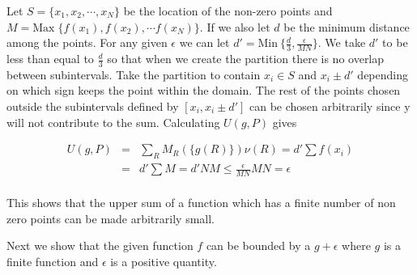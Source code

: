 \documentclass[11pt,reqno]{article}
\begin{document}
Let $S = \{ x_1, x_2,\cdots,x_N \}$ be the location of the non-zero points and $M = \text{Max} \;\{ f(x_1),f(x_2), \cdots f(x_N) \}$. If we also let $d$ be the minimum distance among the points. For any given $\epsilon$ we can let $d' = \text{Min} \: \{ \frac{d}{3}, \frac{\epsilon}{M N} \} $. We take $d'$ to be less than equal to $\frac{d}{3}$ so that when we create the partition there is no overlap between subintervals. Take the partition to contain $x_i \in S$ and $x_i \pm d'$ depending on which sign keeps the point within the domain. The rest of the points chosen outside the subintervals defined by $[x_i,x_i \pm d']$ can be chosen arbitrarily since y will not contribute to the sum. Calculating $U(g,P)$ gives

\begin{eqnarray*}
U(g,P) &=& \sum_R M_R( \{ g(R) \}) \nu(R) = d' \sum f(x_i) \\
&=& d' \sum M = d' N M \le \frac{\epsilon}{MN} MN = \epsilon \\
\end{eqnarray*}

This shows that the upper sum of a function which has a finite number of non zero points can be made arbitrarily small.

Next we show that the given function $f$ can be bounded by a $g + \epsilon$ where $g$ is a finite function and $\epsilon$ is a positive quantity.
\end{document}
